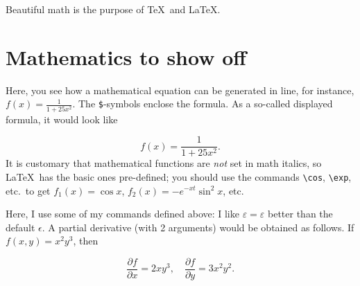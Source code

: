 \renewcommand\TheFile{ch03_mathematics.tex}
\newcommand\premathpar{\vspace{-2\parskip}\par}
\begin{savequote}[15cm]
  \vspace{-30mm}
  \raggedleft
  \sffamily
  Beautiful math is the purpose of \TeX\ and \LaTeX.
\end{savequote}
\chapter{Mathematics to show off}
\newcommand{\half}{\frac{1}{2}}
\newcommand{\eps}{\varepsilon}
\newcommand{\rh}{\rho}
\newcommand{\mtheta}{\vartheta}
\newcommand{\ph}{\varphi}
\newcommand{\der}[2]{\frac{\partial {#1}}{\partial {#2}}}

Here, you see how a mathematical equation can be generated in line, for
instance, $f(x) = \frac{1}{1+25 x^2}$.
The \verb+$+-symbols enclose the formula.
As a so-called displayed formula, it would look like\premathpar
\begin{displaymath}
  f(x) = \frac{1}{1+25 x^2}.
\end{displaymath}
It is customary that mathematical functions are \emph{not} set in math italics,
so \LaTeX\ has the basic ones pre-defined; you should use the commands
\verb+\cos+, \verb+\exp+, etc.\ to get $f_1(x) = \cos x$,
$f_2(x) = - e^{-xt} \sin^2 x$, etc.

Here, I use some of my commands defined above: I like $\eps = \varepsilon$
better than the default $\epsilon$. A partial derivative (with 2 arguments)
would be obtained as follows. If $f(x,y) = x^2 y^3$, then \premathpar
\begin{displaymath}
  \der{f}{x} = 2 x y^3, \quad \der{f}{y} = 3 x^2 y^2.
\end{displaymath}
